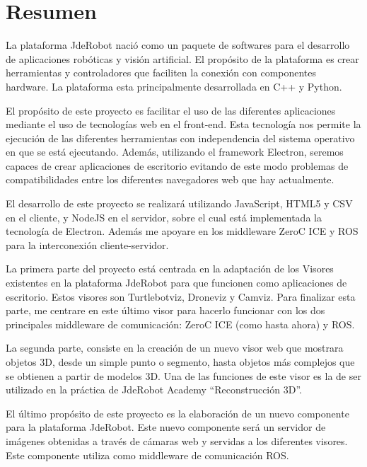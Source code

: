 \chapter*{Resumen}
\setlength{\parskip}{1ex}
La plataforma JdeRobot nació como un paquete de softwares para el desarrollo de aplicaciones robóticas y visión artificial. El propósito de la plataforma es crear herramientas y controladores que faciliten la conexión con componentes hardware. La plataforma esta principalmente desarrollada en C++ y Python.

El propósito de este proyecto es facilitar el uso de las diferentes aplicaciones mediante el uso de tecnologías web en el front-end. Esta tecnología nos permite la ejecución de las diferentes herramientas con independencia del sistema operativo en que se está ejecutando. Además, utilizando el framework Electron, seremos capaces de crear aplicaciones de escritorio evitando de este modo problemas de compatibilidades entre los diferentes navegadores web que hay actualmente.

El desarrollo de este proyecto se realizará utilizando JavaScript, HTML5 y CSV en el cliente, y NodeJS en el servidor, sobre el cual está implementada la tecnología de Electron. Además me apoyare en los middleware ZeroC ICE y ROS para la interconexión cliente-servidor. 

La primera parte del proyecto está centrada en la adaptación de los Visores existentes en la plataforma JdeRobot para que funcionen como aplicaciones de escritorio. Estos visores son Turtlebotviz, Droneviz y  Camviz. Para finalizar esta parte, me centrare en este último visor para hacerlo funcionar con los dos principales middleware de comunicación: ZeroC ICE (como hasta ahora) y ROS.

La segunda parte, consiste en la creación de un nuevo visor web que mostrara objetos 3D, desde un simple punto o segmento, hasta objetos más complejos que se obtienen a partir de modelos 3D. Una de las funciones de este visor es la de ser utilizado en la práctica de JdeRobot Academy “Reconstrucción 3D”.

El último propósito de este proyecto es la elaboración de un nuevo componente para la plataforma JdeRobot. Este nuevo componente será un servidor de imágenes obtenidas a través de cámaras web y servidas a los diferentes visores. Este componente utiliza como middleware de comunicación ROS.
